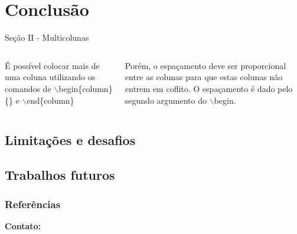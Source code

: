 \documentclass{templatebeamerufc/libs/ufc_format}
\begin{document}
\section{Conclusão}
\begin{frame}{Seção II - Multicolunas}
    \begin{columns}{}
        \begin{column}{0.5\textwidth}
            \justify
            É possível colocar mais de uma coluna utilizando os comandos de $\backslash$begin\{column\}\{\} e $\backslash$end\{column\}
        \end{column}
        \begin{column}{0.5\textwidth}
            \justify
            Porém, o espaçamento deve ser proporcional entre as colunas para que estas colunas não entrem em coflito. O espaçamento é dado pelo segundo argumento do $\backslash$begin.
        \end{column}
    \end{columns}
\end{frame}

\subsection{Limitações e desafios}
\subsection{Trabalhos futuros}


\begin{frame}[allowframebreaks]
  \frametitle{Referências}
  
\end{frame}

\begin{frame}{}
    \centering
    \huge{\textbf{}}

    \vspace{1cm}

    \Large{\textbf{Contato:}}
    \newline
    \vspace*{0.5cm}
    \large{}
\end{frame}
\end{document}

